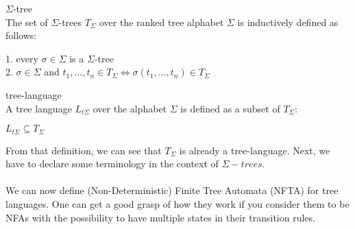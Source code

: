 \documentclass{llncs}
\begin{document}
\begin{definition}{\(\Sigma\)-tree \cite{automata-xml}}
	\\
	The set of \(\Sigma\)-trees \(T_\Sigma\) over the ranked tree alphabet \(\Sigma\) is inductively defined as follows:
	\begin{center}
		1. every \(\sigma \in \Sigma\) is a \(\Sigma\)-tree\\
		2. \(\sigma \in \Sigma\) and \(t_1,...,t_n \in T_\Sigma \iff \sigma(t_1,...,t_n) \in T_\Sigma\) 
	\end{center}
\end{definition}

\pagebreak

\begin{definition}{tree-language \cite{automata-xml}}
	\\
	A tree language \(L_{t\Sigma}\) over the alphabet \(\Sigma\) is defined as a subset of \(T_\Sigma\):
	\begin{center}
		\(L_{t\Sigma} \subseteq T_\Sigma\)
	\end{center}	
\end{definition}

\noindent
From that definition, we can see that \(T_\Sigma\) is already a tree-language.
Next, we have to declare some terminology in the context of $\Sigma-trees$.
\\
\\
We can now define (Non-Deterministic) Finite Tree Automata (NFTA) for tree languages. One can get a good grasp of how they work if you consider them to be NFAs with the possibility to have multiple states in their transition rules.
\end{document}
